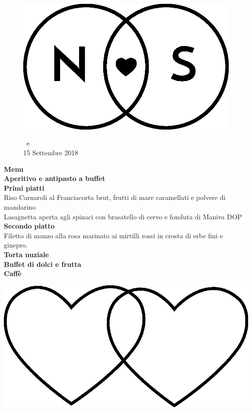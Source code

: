 \documentclass[11pt]{book}
\begin{document}
\begin{center}
\begin{figure}
\centering
\includegraphics[scale=0.3]{img/Logo_piccolo.eps}

\NSposo \ e \NSposa\\
15 Settembre 2018\\
\end{figure}
\vfill
\Huge \textbf{Menu}\\
\hfill\break
\normalsize\textbf{Aperitivo e antipasto a buffet}\\
\hfill\break
\textbf{Primi piatti}\\
Riso Carnaroli al Franciacorta brut, frutti di mare caramellati e polvere di mandarino\\
\hfill\break
Lasagnetta aperta agli spinaci con brasatello di cervo e fonduta di Maniva DOP\\
\hfill\break
\textbf{Secondo piatto}\\
Filetto di manzo alla rosa marinato ai mirtilli rossi in crosta di erbe fini e ginepro.\\
\hfill\break
\textbf{Torta nuziale}\\
\textbf{Buffet di dolci e frutta}\\
\textbf{Caffè}\\
\vfill
\begin{center}
\includegraphics[scale=0.1]{img/cuori_venn.eps}
\end{center}
\end{center}
\end{document}
